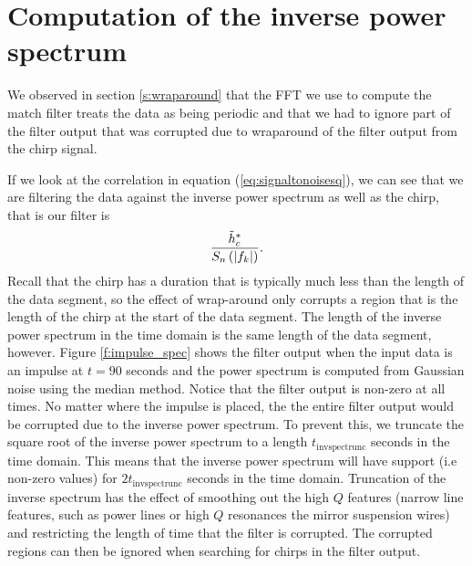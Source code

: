 \section{Computation of the inverse power spectrum}
\label{ss:invspec}

We observed in section \ref{s:wraparound} that the FFT we use to compute the
match filter treats the data as being periodic and that we had to ignore part
of the filter output that was corrupted due to wraparound of the filter output
from the chirp signal. 

If we look at the correlation in equation (\ref{eq:signaltonoisesq}), we can
see that we are filtering the data against the inverse power
spectrum as well as the chirp, that is our filter is
\begin{equation}
\frac{\tilde{h}_c^\ast}{S_n\left(\left|f_{k}\right|\right)}.
\end{equation}
Recall that the chirp has a duration that is typically much less than the
length of the data segment, so the effect of wrap-around only corrupts a
region that is the length of the chirp at the start of the data segment.  The
length of the inverse power spectrum in the time domain is the same length of
the data segment, however. Figure \ref{f:impulse_spec} shows the filter output
when the input data is an impulse at $t=90$ seconds and the power spectrum is
computed from Gaussian noise using the median method. Notice that the filter
output is non-zero at all times. No matter where the impulse
is placed, the the entire filter output would be corrupted due to the inverse
power spectrum.  To prevent this, we truncate the square root of the inverse
power spectrum to a length $t_\mathrm{invspectrunc}$ seconds in the time
domain. This means that the inverse power spectrum will have support (i.e
non-zero values) for $2t_\mathrm{invspectrunc}$ seconds in the time domain.
Truncation of the inverse spectrum has the effect of smoothing out the high
$Q$ features (narrow line features, such as power lines or high $Q$ resonances
the mirror suspension wires) and restricting the length of time that the filter 
is corrupted. The corrupted regions can then be ignored when searching for
chirps in the filter output.

